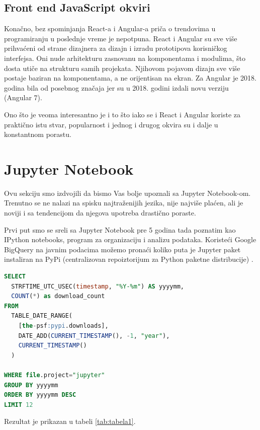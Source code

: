 \documentclass[a4paper]{article}
\begin{document}
\subsection{Front end JavaScript okviri}
\label{subsec:front end javascript okviri}

Konačno, bez spominjanja React-a i Angular-a priča o trendovima u programiranju u poslednje vreme je nepotpuna. React i Angular su sve više prihvaćeni od strane dizajnera za dizajn i izradu prototipova korisničkog interfejsa. Oni nude arhitekturu zasnovanu na komponentama i modulima, što dosta utiče na strukturu samih projekata. Njihovom pojavom dizajn sve više postaje baziran na komponentama, a ne orijentisan na ekran. Za Angular je 2018. godina bila od posebnog značaja jer su u 2018. godini izdali novu verziju (Angular 7).

Ono što je veoma interesantno je i to što iako se i React i Angular koriste za praktično istu stvar, popularnost i jednog i drugog okvira su i dalje u konstantnom porastu.

\section{Jupyter Notebook}
\label{sec:jupyter notebok}

Ovu sekciju smo izdvojili da bismo Vas bolje upoznali sa Jupyter Notebook-om. Trenutno se ne nalazi na spisku najtraženijih jezika, nije najviše plaćen, ali je noviji i sa tendencijom da njegova upotreba drastično poraste.

Prvi put smo se sreli sa Jupyter Notebook pre 5 godina tada poznatim kao IPython notebooks, program za organizaciju i analizu podataka. Koristeći Google BigQuery na javnim podacima možemo pronaći koliko puta je Jupyter paket instaliran na PyPi (centralizovan repoiztorijum za Python paketne distribucije) \cite{jupyter}.

\begin{lstlisting}[caption={Broj instalacija Jupyter Python paketa na PyPi},frame=single, label=simple, language=SQL]
SELECT
  STRFTIME_UTC_USEC(timestamp, "%Y-%m") AS yyyymm,
  COUNT(*) as download_count
FROM
  TABLE_DATE_RANGE(
    [the-psf:pypi.downloads],
    DATE_ADD(CURRENT_TIMESTAMP(), -1, "year"),
    CURRENT_TIMESTAMP()
  )
 
WHERE file.project="jupyter"
GROUP BY yyyymm
ORDER BY yyyymm DESC
LIMIT 12
\end{lstlisting}

Rezultat je prikazan u tabeli \ref{tab:tabela1}.
\end{document}
